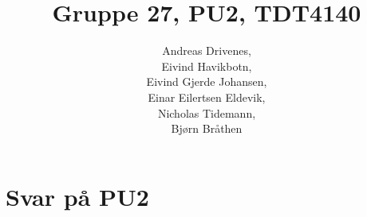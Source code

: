 \documentclass[english, a4paper]{article}
\title{Gruppe 27, PU2, TDT4140}
\author{	Andreas Drivenes,\\
		Eivind Havikbotn,\\
		Eivind Gjerde Johansen,\\
		Einar Eilertsen Eldevik,\\
		Nicholas Tidemann,\\
		Bjørn Bråthen\\
}
\begin{document}

\maketitle

\section{Svar på PU2}



\end{document}
